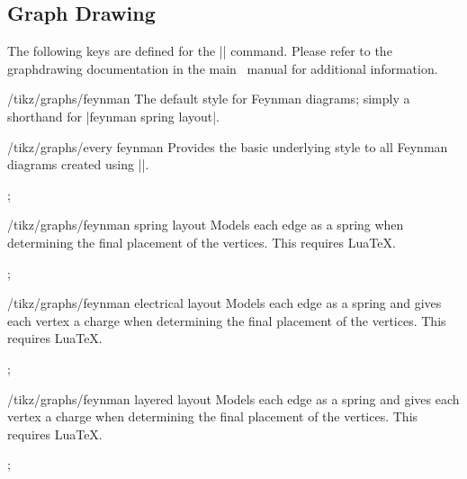 \documentclass[a4paper,final]{ltxdoc}
\providecommand{\LuaTeX}{Lua\TeX}
\begin{document}
\subsection{Graph Drawing}
\label{subsec:graph_drawing}

The following keys are defined for the |\graph| command.  Please refer to the
graphdrawing documentation in the main \tikzname~manual for additional information.

\begin{key}{/tikz/graphs/feynman}
  The default style for Feynman diagrams; simply a shorthand for |feynman spring layout|.
\end{key}

\begin{key}{/tikz/graphs/every feynman}
  Provides the basic underlying style to all Feynman diagrams created using
  |\graph|.

\begin{codeexample}[]
\tikz {};
\end{codeexample}
\end{key}

\begin{key}{/tikz/graphs/feynman spring layout}
  Models each edge as a spring when determining the final placement of the
  vertices.  This requires \LuaTeX.

\begin{codeexample}[]
\tikz {};
\end{codeexample}
\end{key}

\begin{key}{/tikz/graphs/feynman electrical layout}
  Models each edge as a spring and gives each vertex a charge when determining
  the final placement of the vertices.  This requires \LuaTeX.

\begin{codeexample}[]
\tikz {};
\end{codeexample}
\end{key}

\begin{key}{/tikz/graphs/feynman layered layout}
  Models each edge as a spring and gives each vertex a charge when determining
  the final placement of the vertices.  This requires \LuaTeX.

\begin{codeexample}[]
\tikz {};
\end{codeexample}
\end{key}
\end{document}
